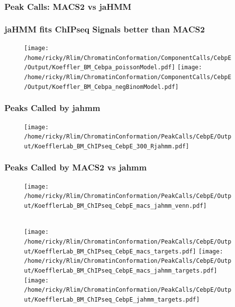 \documentclass[notes]{beamer}
\begin{document}
\begin{frame}
    \frametitle{Peak Calls: MACS2 vs jaHMM}
    \begin{itemize}
    \end{itemize}
\end{frame}

\begin{frame}[plain]
    \frametitle{jaHMM fits ChIPseq Signals better than MACS2}
    \begin{figure}
        \texttt{[image: /home/ricky/Rlim/ChromatinConformation/ComponentCalls/CebpE/Output/Koeffler\_BM\_Cebpa\_poissonModel.pdf]}
        \texttt{[image: /home/ricky/Rlim/ChromatinConformation/ComponentCalls/CebpE/Output/Koeffler\_BM\_Cebpa\_negBinomModel.pdf]}
    \end{figure}
\end{frame}

\begin{frame}[plain]
    \frametitle{Peaks Called by jahmm}
    \begin{figure}
        \texttt{[image: /home/ricky/Rlim/ChromatinConformation/PeakCalls/CebpE/Output/KoefflerLab\_BM\_ChIPseq\_CebpE\_300\_Rjahmm.pdf]}
    \end{figure}
\end{frame}

\begin{frame}[plain]
    \frametitle{Peaks Called by MACS2 vs jahmm}
    \begin{figure}                           
        \begin{center}
            \texttt{[image: /home/ricky/Rlim/ChromatinConformation/PeakCalls/CebpE/Output/KoefflerLab\_BM\_ChIPseq\_CebpE\_macs\_jahmm\_venn.pdf]}
        \end{center}
        \\
        \texttt{[image: /home/ricky/Rlim/ChromatinConformation/PeakCalls/CebpE/Output/KoefflerLab\_BM\_ChIPseq\_CebpE\_macs\_targets.pdf]}
        \texttt{[image: /home/ricky/Rlim/ChromatinConformation/PeakCalls/CebpE/Output/KoefflerLab\_BM\_ChIPseq\_CebpE\_macs\_jahmm\_targets.pdf]}
        \texttt{[image: /home/ricky/Rlim/ChromatinConformation/PeakCalls/CebpE/Output/KoefflerLab\_BM\_ChIPseq\_CebpE\_jahmm\_targets.pdf]}
    \end{figure}
\end{frame}
\end{document}
